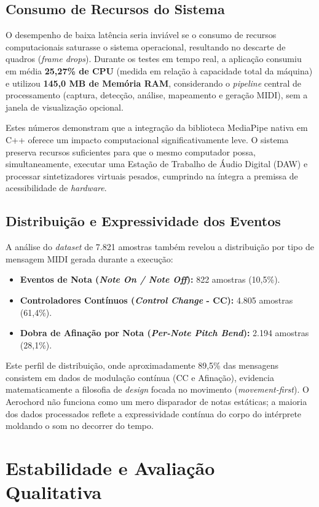 \subsection{Consumo de Recursos do Sistema}
O desempenho de baixa latência seria inviável se o consumo de recursos computacionais saturasse o sistema operacional, resultando no descarte de quadros (\textit{frame drops}). Durante os testes em tempo real, a aplicação consumiu em média \textbf{25,27\% de CPU} (medida em relação à capacidade total da máquina) e utilizou \textbf{145,0 MB de Memória RAM}, considerando o \textit{pipeline} central de processamento (captura, detecção, análise, mapeamento e geração MIDI), sem a janela de visualização opcional.

Estes números demonstram que a integração da biblioteca MediaPipe nativa em C++ oferece um impacto computacional significativamente leve. O sistema preserva recursos suficientes para que o mesmo computador possa, simultaneamente, executar uma Estação de Trabalho de Áudio Digital (DAW) e processar sintetizadores virtuais pesados, cumprindo na íntegra a premissa de acessibilidade de \textit{hardware}.

\subsection{Distribuição e Expressividade dos Eventos}
A análise do \textit{dataset} de 7.821 amostras também revelou a distribuição por tipo de mensagem MIDI gerada durante a execução:
\begin{itemize}
    \item \textbf{Eventos de Nota (\textit{Note On / Note Off}):} 822 amostras (10,5\%).
    \item \textbf{Controladores Contínuos (\textit{Control Change} - CC):} 4.805 amostras (61,4\%).
    \item \textbf{Dobra de Afinação por Nota (\textit{Per-Note Pitch Bend}):} 2.194 amostras (28,1\%).
\end{itemize}

Este perfil de distribuição, onde aproximadamente 89,5\% das mensagens consistem em dados de modulação contínua (CC e Afinação), evidencia matematicamente a filosofia de \textit{design} focada no movimento (\textit{movement-first}). O Aerochord não funciona como um mero disparador de notas estáticas; a maioria dos dados processados reflete a expressividade contínua do corpo do intérprete moldando o som no decorrer do tempo.

\section{Estabilidade e Avaliação Qualitativa}
\label{sec:avaliacao_qualitativa}

